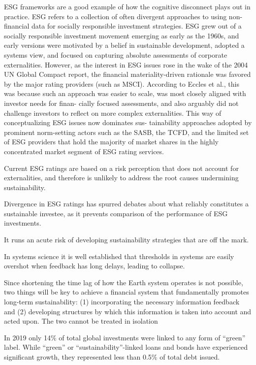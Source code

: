 \documentclass[
]{book}
\begin{document}
ESG frameworks are a good example of how the cognitive
disconnect plays out in practice. ESG refers to a collection of often
divergent approaches to using non-financial data for socially
responsible investment strategies. ESG grew out of a socially
responsible investment movement emerging as early as the
1960s, and early versions were motivated by a belief in sustainable
development, adopted a systems view, and focused on capturing
absolute assessments of corporate externalities. However, as
the interest in ESG issues rose in the wake of the 2004 UN Global
Compact report, the financial materiality-driven rationale was
favored by the major rating providers (such as MSCI). According
to Eccles et al., this was because such an approach was easier
to scale, was most closely aligned with investor needs for finan-
cially focused assessments, and also arguably did not challenge
investors to reflect on more complex externalities.
This way of conceptualizing ESG issues now dominates sus-
tainability approaches adopted by prominent norm-setting
actors such as the SASB, the TCFD, and the limited set of ESG
providers that hold the majority of market shares in the highly
concentrated market segment of ESG rating services.

Current ESG ratings are based on a risk
perception that does not account for externalities, and therefore
is unlikely to address the root causes undermining sustainability.

Divergence in ESG
ratings has spurred debates about what reliably constitutes a
sustainable investee, as it prevents comparison of the performance of ESG investments.

It runs an acute risk of developing sustainability strategies that are off the mark.

In systems science it is well
established that thresholds in systems are easily overshot
when feedback has long delays, leading to collapse.

Since shortening the time lag of how the Earth system operates
is not possible, two things will be key to achieve a financial
system that fundamentally promotes long-term sustainability:
(1) incorporating the necessary information feedback and
(2) developing structures by which this information is taken
into account and acted upon. The two cannot be treated in
isolation

In 2019 only 14\% of total global investments were linked to any form of ``green'' label.
While ``green'' or ``sustainability''-linked loans and bonds
have experienced significant growth, they represented less
than 0.5\% of total debt issued.
\end{document}
